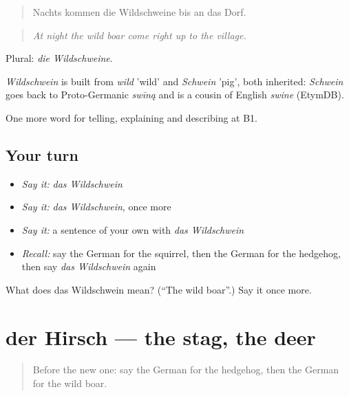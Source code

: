 \begin{quote}
Nachts kommen die Wildschweine bis an das Dorf.
\end{quote}

\begin{quote}
\emph{At night the wild boar come right up to the village.}
\end{quote}

Plural: \emph{die Wildschweine}.

\begin{cousinweb}
\emph{Wildschwein} is built from \emph{wild} 'wild' and \emph{Schwein} 'pig', both inherited: \emph{Schwein} goes back to Proto-Germanic \emph{swīną} and is a cousin of English \emph{swine} (EtymDB).
\end{cousinweb}

\begin{grammarlens}[title={What you've built}]
One more word for telling, explaining and describing at B1.
\end{grammarlens}

\subsection*{Your turn}
\begin{itemize}
\raggedright
  \item \emph{Say it:} \emph{das Wildschwein}
  \item \emph{Say it:} \emph{das Wildschwein}, once more
  \item \emph{Say it:} a sentence of your own with \emph{das Wildschwein}
  \item \emph{Recall:} say the German for the squirrel, then the German for the hedgehog, then say \emph{das Wildschwein} again
\end{itemize}

\begin{tcolorbox}[breakable,colback=teal!4,colframe=teal!35!black,title={Before you move on}]
What does das Wildschwein mean? (\textquotedblleft{}The wild boar\textquotedblright{}.) Say it once more.
\end{tcolorbox}
\section[der Hirsch]{der Hirsch — the stag, the deer}

\label{lesson:GE-C458-hirsch}



\begin{quote}
Before the new one: say the German for the hedgehog, then the German for the wild boar.
\end{quote}

